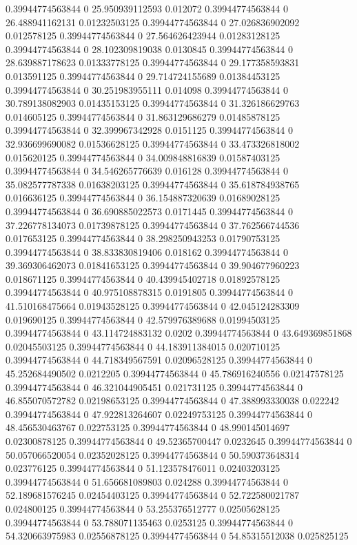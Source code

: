 0.39944774563844 0 25.950939112593 0.012072
0.39944774563844 0 26.488941162131 0.01232503125
0.39944774563844 0 27.026836902092 0.012578125
0.39944774563844 0 27.564626423944 0.01283128125
0.39944774563844 0 28.102309819038 0.0130845
0.39944774563844 0 28.639887178623 0.01333778125
0.39944774563844 0 29.177358593831 0.013591125
0.39944774563844 0 29.714724155689 0.01384453125
0.39944774563844 0 30.251983955111 0.014098
0.39944774563844 0 30.789138082903 0.01435153125
0.39944774563844 0 31.326186629763 0.014605125
0.39944774563844 0 31.863129686279 0.01485878125
0.39944774563844 0 32.399967342928 0.0151125
0.39944774563844 0 32.936699690082 0.01536628125
0.39944774563844 0 33.473326818002 0.015620125
0.39944774563844 0 34.009848816839 0.01587403125
0.39944774563844 0 34.546265776639 0.016128
0.39944774563844 0 35.082577787338 0.01638203125
0.39944774563844 0 35.618784938765 0.016636125
0.39944774563844 0 36.154887320639 0.01689028125
0.39944774563844 0 36.690885022573 0.0171445
0.39944774563844 0 37.226778134073 0.01739878125
0.39944774563844 0 37.762566744536 0.017653125
0.39944774563844 0 38.298250943253 0.01790753125
0.39944774563844 0 38.833830819406 0.018162
0.39944774563844 0 39.369306462073 0.01841653125
0.39944774563844 0 39.904677960223 0.018671125
0.39944774563844 0 40.439945402718 0.01892578125
0.39944774563844 0 40.975108878315 0.0191805
0.39944774563844 0 41.510168475664 0.01943528125
0.39944774563844 0 42.045124283309 0.019690125
0.39944774563844 0 42.579976389688 0.01994503125
0.39944774563844 0 43.114724883132 0.0202
0.39944774563844 0 43.649369851868 0.02045503125
0.39944774563844 0 44.183911384015 0.020710125
0.39944774563844 0 44.718349567591 0.02096528125
0.39944774563844 0 45.252684490502 0.0212205
0.39944774563844 0 45.786916240556 0.02147578125
0.39944774563844 0 46.321044905451 0.021731125
0.39944774563844 0 46.855070572782 0.02198653125
0.39944774563844 0 47.388993330038 0.022242
0.39944774563844 0 47.922813264607 0.02249753125
0.39944774563844 0 48.456530463767 0.022753125
0.39944774563844 0 48.990145014697 0.02300878125
0.39944774563844 0 49.52365700447 0.0232645
0.39944774563844 0 50.057066520054 0.02352028125
0.39944774563844 0 50.590373648314 0.023776125
0.39944774563844 0 51.123578476011 0.02403203125
0.39944774563844 0 51.656681089803 0.024288
0.39944774563844 0 52.189681576245 0.02454403125
0.39944774563844 0 52.722580021787 0.024800125
0.39944774563844 0 53.255376512777 0.02505628125
0.39944774563844 0 53.788071135463 0.0253125
0.39944774563844 0 54.320663975983 0.02556878125
0.39944774563844 0 54.85315512038 0.025825125
